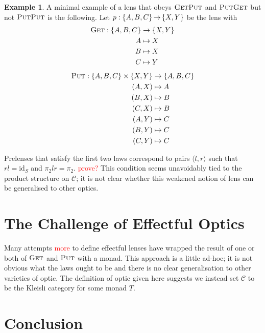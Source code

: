 \documentclass[11pt,a4paper]{article}
\theoremstyle{plain}
\theoremstyle{definition}
\newtheorem{example}[theorem]{Example}
\newcommand{\C}{\mathscr{C}}
\newcommand{\id}{\mathrm{id}}
\newcommand{\fget}{\textsc{Get}}
\newcommand{\fput}{\textsc{Put}}
\newcommand{\hto}{\ensuremath{\,\mathaccent\shortmid\rightarrow\,}}
\newcommand{\todo}[1]{\textcolor{red}{\small #1}}
\begin{document}
\begin{example}
A minimal example of a lens that obeys $\fget\fput$ and $\fput\fget$ but not $\fput\fput$ is the following. Let $p : \{A,B,C\} \hto \{X, Y\}$ be the lens with
\begin{align*}
\fget : \{A,B,C\} &\to \{X, Y\} \\
A &\mapsto X \\
B &\mapsto X \\
C &\mapsto Y 
\end{align*}
\begin{align*}
\fput : \{A,B,C\} \times \{X, Y\} &\to \{A,B,C\} \\
(A,X) &\mapsto A \\
(B,X) &\mapsto B \\
(C,X) &\mapsto B \\
(A,Y) &\mapsto C \\
(B,Y) &\mapsto C \\
(C,Y) &\mapsto C
\end{align*}
\end{example}

Prelenses that satisfy the first two laws correspond to pairs $\langle l, r \rangle$ such that $rl = \id_S$ and $\pi_2lr = \pi_2$. \todo{prove?} This condition seems unavoidably tied to the product structure on $\C$; it is not clear whether this weakened notion of lens can be generalised to other optics.

\section{The Challenge of Effectful Optics}

Many attempts \cite{ReflectionsOnMonadicLenses} \todo{more} to define effectful lenses have wrapped the result of one or both of $\fget$ and $\fput$ with a monad. This approach is a little ad-hoc; it is not obvious what the laws ought to be and there is no clear generalisation to other varieties of optic. The definition of optic given here suggests we instead set $\C$ to be the Kleisli category for some monad $T$.

\section{Conclusion}



\end{document}
